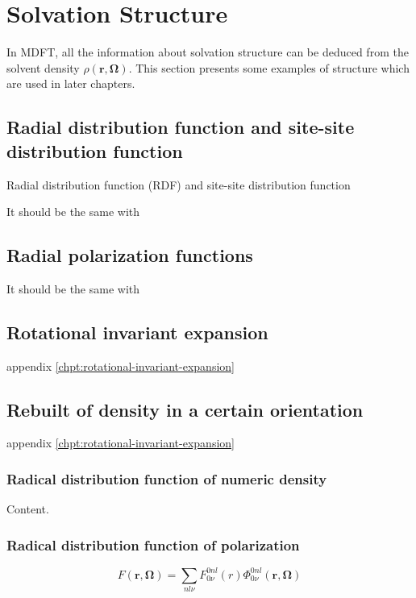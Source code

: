 
\chapter{Solvation Structure\label{chpt:solvation-structure}}

In MDFT, all the information about solvation structure can be deduced
from the solvent density $\rho(\mathbf{r},\mathbf{\Omega})$. This
section presents some examples of structure which are used in later
chapters.


\section{Radial distribution function and site-site distribution function}

Radial distribution function (\acs{RDF}) and site-site distribution
function

It should be the same with 


\section{Radial polarization functions}

It should be the same with 


\section{Rotational invariant expansion}

appendix \ref{chpt:rotational-invariant-expansion}


\section{Rebuilt of density in a certain orientation}

appendix \ref{chpt:rotational-invariant-expansion}


\subsection{Radical distribution function of numeric density}

Content.


\subsection{Radical distribution function of polarization}

\[
F(\mathbf{r},\mathbf{\Omega})=\sum_{nl\nu}F_{0\nu}^{0nl}(r)\Phi_{0\nu}^{0nl}(\mathbf{r},\mathbf{\Omega})
\]


